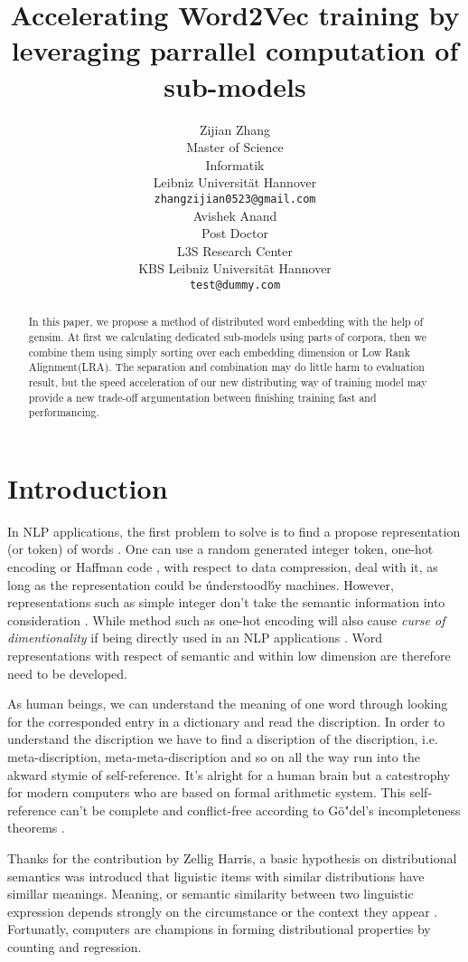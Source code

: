 \documentclass[11pt,a4paper]{article}
\title{Accelerating Word2Vec training by leveraging parrallel computation of sub-models}
\author{Zijian Zhang \\
  Master of Science\\
  Informatik\\
  Leibniz Universit{\"a}t Hannover\\
  {\tt zhangzijian0523@gmail.com}\\ \And
  Avishek Anand\\
  Post Doctor\\
  L3S Research Center\\
  KBS Leibniz Universit{\"a}t Hannover\\
  {\tt test@dummy.com}\\
  }
\date{}
\begin{document}
\maketitle

\begin{abstract}

    In this paper, we propose a method of distributed word embedding with the help of gensim. At first we calculating dedicated sub-models using parts of corpora, then we combine them using simply sorting over each embedding dimension or Low Rank Alignment(LRA). The separation and combination may do little harm to evaluation result, but the speed acceleration of our new distributing way of training model may provide a new trade-off argumentation between finishing training fast and performancing.
 
\end{abstract}


\section{Introduction}
In NLP applications, the first problem to solve is to find a propose representation (or token) of words \cite{schutze2008introduction}. One can use a random generated integer token, one-hot encoding \cite{turian2010word} or Haffman code \cite{el2006compression}, with respect to data compression, deal with it, as long as the representation could be \'understood\' by machines. However, representations such as simple integer don't take the semantic information into consideration \cite{le2014distributed}. While method such as one-hot encoding will also cause \textit{curse of dimentionality} if being directly used in an NLP applications \cite{bengio2003neural}. Word representations with respect of semantic and within low dimension are therefore need to be developed. 

As human beings, we can understand the meaning of one word through looking for the corresponded entry in a dictionary and read the discription. In order to understand the discription we have to find a discription of the discription, i.e. meta-discription, meta-meta-discription and so on all the way run into the akward stymie of self-reference. It's alright for a human brain but a catestrophy for modern computers who are based on formal arithmetic system. This self-reference can't be complete and conflict-free according to G{\"o"}del's incompleteness theorems \cite{godel1931formal}.

Thanks for the contribution by Zellig Harris, a basic hypothesis on distributional semantics was introducd that liguistic items with similar distributions have simillar meanings. Meaning, or semantic similarity between two linguistic expression depends strongly on the circumstance or the context they appear \cite{harris1954distributional}. Fortunatly, computers are champions in forming distributional properties by counting and regression.
\end{document}
